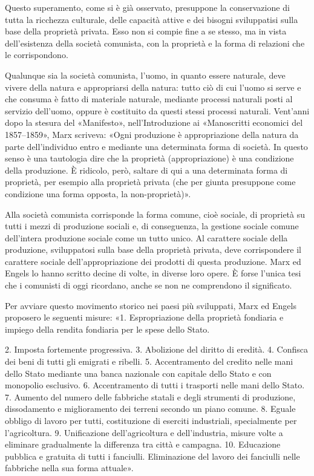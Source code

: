 \documentclass[12pt,a4paper,openany]{book}
\begin{document}
Questo superamento, come si è già osservato, presuppone la conservazione di tutta la ricchezza culturale, delle capacità attive e dei bisogni sviluppatisi sulla base della proprietà privata. Esso non si compie fine a se stesso, ma in vista dell'esistenza della società comunista, con la proprietà e la forma di relazioni che le corrispondono.

Qualunque sia la società comunista, l'uomo, in quanto essere naturale, deve vivere della natura e appropriarsi della natura: tutto ciò di cui l'uomo si serve e che consuma è fatto di materiale naturale, mediante processi naturali posti al servizio dell'uomo, oppure è costituito da questi stessi processi naturali. Vent'anni dopo la stesura del «Manifesto», nell'Introduzione ai «Manoscritti economici del 1857–1859», Marx scriveva: «Ogni produzione è appropriazione della natura da parte dell'individuo entro e mediante una determinata forma di società. In questo senso è una tautologia dire che la proprietà (appropriazione) è una condizione della produzione. È ridicolo, però, saltare di qui a una determinata forma di proprietà, per esempio alla proprietà privata (che per giunta presuppone come condizione una forma opposta, la non-proprietà)».

Alla società comunista corrisponde la forma comune, cioè sociale, di proprietà su tutti i mezzi di produzione sociali e, di conseguenza, la gestione sociale comune dell'intera produzione sociale come un tutto unico. Al carattere sociale della produzione, sviluppatosi sulla base della proprietà privata, deve corrispondere il carattere sociale dell'appropriazione dei prodotti di questa produzione. Marx ed Engels lo hanno scritto decine di volte, in diverse loro opere. È forse l'unica tesi che i comunisti di oggi ricordano, anche se non ne comprendono il significato.

Per avviare questo movimento storico nei paesi più sviluppati, Marx ed Engels proposero le seguenti misure: «1. Espropriazione della proprietà fondiaria e impiego della rendita fondiaria per le spese dello Stato.

2. Imposta fortemente progressiva. 3. Abolizione del diritto di eredità. 4. Confisca dei beni di tutti gli emigrati e ribelli. 5. Accentramento del credito nelle mani dello Stato mediante una banca nazionale con capitale dello Stato e con monopolio esclusivo. 6. Accentramento di tutti i trasporti nelle mani dello Stato. 7. Aumento del numero delle fabbriche statali e degli strumenti di produzione, dissodamento e miglioramento dei terreni secondo un piano comune. 8. Eguale obbligo di lavoro per tutti, costituzione di eserciti industriali, specialmente per l'agricoltura. 9. Unificazione dell'agricoltura e dell'industria, misure volte a eliminare gradualmente la differenza tra città e campagna. 10. Educazione pubblica e gratuita di tutti i fanciulli. Eliminazione del lavoro dei fanciulli nelle fabbriche nella sua forma attuale».
\end{document}
